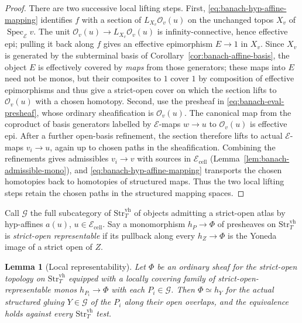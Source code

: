 \documentclass[12pt]{amsart}
\newtheorem{lem}[thm]{Lemma}
\theoremstyle{definition}
\theoremstyle{remark}
\numberwithin{equation}{section}
\newcommand{\E}{\mathcal E}
\DeclareMathOperator{\Spec}{Spec}
\begin{document}
\begin{proof}
There are two successive local lifting steps. First,
\eqref{eq:banach-hyp-affine-mapping} identifies $f$ with a section
of $L_{X_v}\mathcal O_v(u)$ on the unchanged topos $X_v$ of
$\Spec_{\E}v$. The unit
$\mathcal O_v(u)\to L_{X_v}\mathcal O_v(u)$ is
infinity-connective, hence effective epi; pulling it back along $f$
gives an effective epimorphism $E\to 1$ in $X_v$. Since $X_v$ is
generated by the subterminal basis of
Corollary~\ref{cor:banach-affine-basis}, the object $E$ is
effectively covered by \emph{maps} from those generators; these maps
into $E$ need not be monos, but their composites to $1$ cover $1$ by
composition of effective epimorphisms and thus give a strict-open
cover on which the section lifts to $\mathcal O_v(u)$ with a chosen
homotopy. Second, use the presheaf in
\eqref{eq:banach-eval-presheaf}, whose ordinary sheafification is
$\mathcal O_v(u)$. The canonical map from the coproduct of basis
generators labelled by $\E$-maps $w\to u$ to $\mathcal O_v(u)$
is effective epi. After a further open-basis refinement, the
section therefore lifts to actual $\E$-maps $v_i\to u$, again
up to chosen paths in the sheafification. Combining the refinements
gives admissibles $v_i\to v$ with sources in $\E_{\mathrm{cell}}$
(Lemma~\ref{lem:banach-admissible-mono}), and
\eqref{eq:banach-hyp-affine-mapping} transports the chosen homotopies
back to homotopies of structured maps. Thus the two local lifting
steps retain the chosen paths in the structured mapping spaces.
\end{proof}

Call $\mathcal G$ the full subcategory of
$\mathrm{Str}_T^{\mathrm{vh}}$ of objects admitting a strict-open
atlas by hyp-affines $a(u)$, $u\in\E_{\mathrm{cell}}$. Say a
monomorphism $h_P\to \Phi$ of presheaves on
$\mathrm{Str}_T^{\mathrm{vh}}$ is \emph{strict-open representable} if
its pullback along every $h_Z\to\Phi$ is the Yoneda image of a
strict open of $Z$.

\begin{lem}[Local representability]
\label{lem:banach-local-representability}
Let $\Phi$ be an ordinary sheaf for the strict-open topology on
$\mathrm{Str}_T^{\mathrm{vh}}$ equipped with a locally covering
family of strict-open-representable monos $h_{P_i}\to\Phi$ with each
$P_i\in\mathcal G$. Then $\Phi\simeq h_Y$ for the actual structured
gluing $Y\in\mathcal G$ of the $P_i$ along their open overlaps, and
the equivalence holds against every $\mathrm{Str}_T^{\mathrm{vh}}$
test.
\end{lem}
\end{document}
